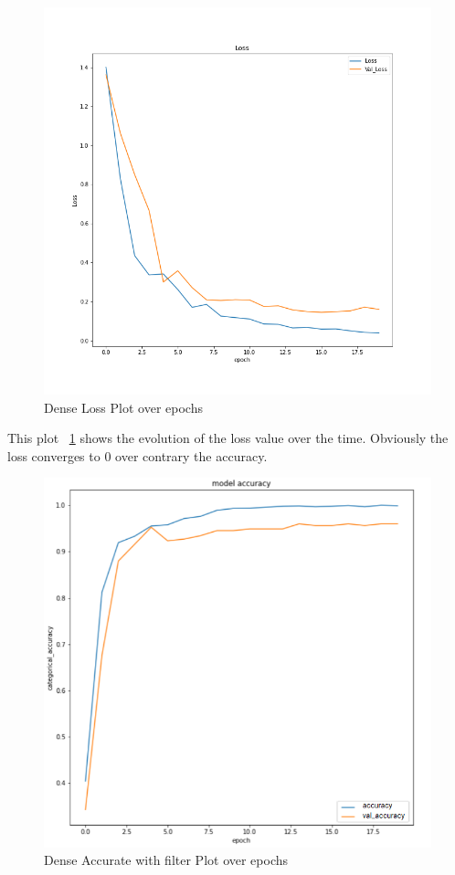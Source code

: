 \documentclass[a4paper]{article}
\begin{document}
  \begin{figure}[H]
    \includegraphics[width=\linewidth]{images/history22_loss.png}
            \caption{Dense Loss Plot over epochs}
    \label{fig:loss_dense}
  \end{figure}    
This plot  ~\ref{fig:loss_dense} shows the evolution of the loss value over the time. Obviously the loss converges to 0 over contrary the accuracy.

 \begin{figure}[H]
    \includegraphics[width=\linewidth]{images/new_2.png}
            \caption{Dense Accurate with filter Plot over epochs}
    \label{fig:desne_filter_accu}
  \end{figure} 
 
\end{document}
